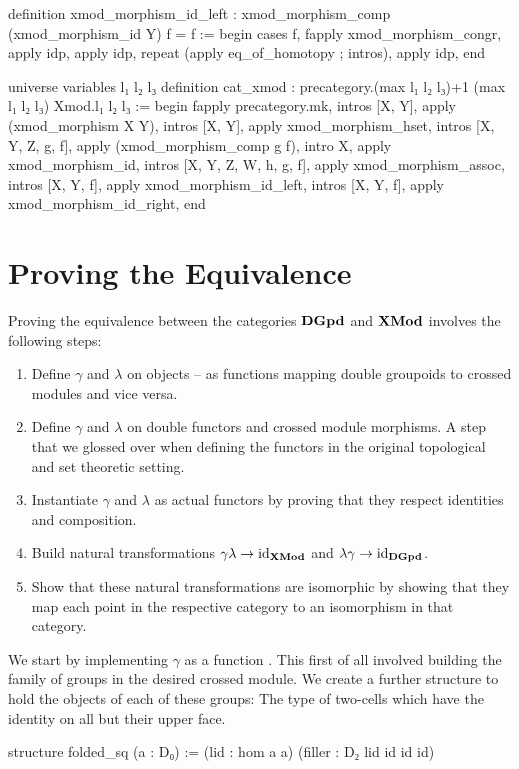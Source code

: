 \begin{leancodebr}
  definition xmod_morphism_id_left :
    xmod_morphism_comp (xmod_morphism_id Y) f = f :=
  begin
    cases f,
    fapply xmod_morphism_congr,
        apply idp,
      apply idp,
    repeat (apply eq_of_homotopy ; intros),
    apply idp,
  end

  universe variables l₁ l₂ l₃
  definition cat_xmod :
    precategory.{(max l₁ l₂ l₃)+1 (max l₁ l₂ l₃)} Xmod.{l₁ l₂ l₃} :=
  begin
    fapply precategory.mk,
      intros [X, Y], apply (xmod_morphism X Y),
      intros [X, Y], apply xmod_morphism_hset,
      intros [X, Y, Z, g, f], apply (xmod_morphism_comp g f),
      intro X, apply xmod_morphism_id,
      intros [X, Y, Z, W, h, g, f], apply xmod_morphism_assoc,
      intros [X, Y, f], apply xmod_morphism_id_left,
    intros [X, Y, f], apply xmod_morphism_id_right,
  end
\end{leancodebr}



\section{Proving the Equivalence}

Proving the equivalence between the categories $\mathbf{DGpd}$ and $\mathbf{XMod}$ involves the
following steps:
\begin{enumerate}
\item Define $\gamma$ and $\lambda$ on objects -- as functions mapping double
groupoids to crossed modules and vice versa.
\item Define $\gamma$ and $\lambda$ on double functors and crossed module morphisms.
A step that we glossed over when defining the functors in the original topological and
set theoretic setting.
\item Instantiate $\gamma$ and $\lambda$ as actual functors by proving that
they respect identities and composition.
\item Build natural transformations $\gamma\lambda \to \operatorname{id}_{\mathbf{XMod}}$ and
$\lambda\gamma \to \operatorname{id}_{\mathbf{DGpd}}$.
\item Show that these natural transformations are isomorphic by showing that they
map each point in the respective category to an isomorphism in that category.
\end{enumerate} %

We start by implementing $\gamma$ as a function .
This first of all involved building the family of groups in the desired
crossed module.
We create a further structure to hold the objects of each of these groups:
The type of two-cells which have the identity on all but their upper face.
\begin{leancodebr}
  structure folded_sq (a : D₀) :=
    (lid : hom a a)
    (filler : D₂ lid id id id)
\end{leancodebr}

